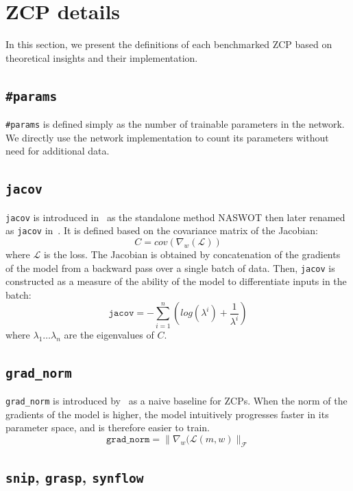 \documentclass[10pt]{article} %
\begin{document}
\section{ZCP details}
\label{apx_zcp}

In this section, we present the definitions of each benchmarked ZCP based on theoretical insights and their implementation.

\subsection{\texttt{\#params}}

\texttt{\#params} is defined simply as the number of trainable parameters in the network. We directly use the network implementation to count its parameters without need for additional data.

\subsection{\texttt{jacov}}

\texttt{jacov} is introduced in~\citet{mellor2021neural} as the standalone method NASWOT then later renamed as \texttt{jacov} in~\citet{abdelfattah2021zero}. It is defined based on the covariance matrix of the Jacobian:
$$
C = cov(\nabla_w(\mathcal{L}))
$$
where $\mathcal{L}$ is the loss. The Jacobian is obtained by concatenation of the gradients of the model from a backward pass over a single batch of data. Then, \texttt{jacov} is constructed as a measure of the ability of the model to differentiate inputs in the batch:
$$
\texttt{jacov} = - \sum_{i=1}^n \left(log(\lambda^i) + \frac{1}{\lambda^i}\right)
$$
where $\lambda_1 \dots \lambda_n$ are the eigenvalues of $C$.

\subsection{\texttt{grad\_norm}}

\texttt{grad\_norm} is introduced by~\citet{abdelfattah2021zero} as a naive baseline for ZCPs. When the norm of the gradients of the model is higher, the model intuitively progresses faster in its parameter space, and is therefore easier to train.
$$
\texttt{grad\_norm} = \|\nabla_w(\mathcal{L}(m, w)\|_{\mathcal{F}}
$$

\subsection{\texttt{snip}, \texttt{grasp}, \texttt{synflow}}
\end{document}
